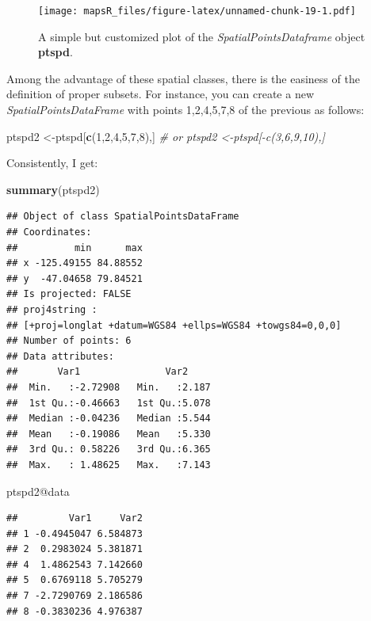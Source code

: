 \documentclass[]{report}
\newenvironment{Shaded}{\begin{snugshade}}{\end{snugshade}}
\newcommand{\KeywordTok}[1]{\textcolor[rgb]{0.13,0.29,0.53}{\textbf{{#1}}}}
\newcommand{\DecValTok}[1]{\textcolor[rgb]{0.00,0.00,0.81}{{#1}}}
\newcommand{\CommentTok}[1]{\textcolor[rgb]{0.56,0.35,0.01}{\textit{{#1}}}}
\newcommand{\NormalTok}[1]{{#1}}
\begin{document}
\begin{figure}[htbp]
\centering
\texttt{[image: mapsR\_files/figure-latex/unnamed-chunk-19-1.pdf]}
\caption{A simple but customized plot of the
\emph{SpatialPointsDataframe} object \textbf{ptspd}.}
\end{figure}

Among the advantage of these spatial classes, there is the easiness of
the definition of proper subsets. For instance, you can create a new
\emph{SpatialPointsDataFrame} with points 1,2,4,5,7,8 of the previous as
follows:

\begin{Shaded}
\begin{Highlighting}[]
\NormalTok{ptspd2 <-ptspd[}\KeywordTok{c}\NormalTok{(}\DecValTok{1}\NormalTok{,}\DecValTok{2}\NormalTok{,}\DecValTok{4}\NormalTok{,}\DecValTok{5}\NormalTok{,}\DecValTok{7}\NormalTok{,}\DecValTok{8}\NormalTok{),]}
\CommentTok{# or ptspd2 <-ptspd[-c(3,6,9,10),]}
\end{Highlighting}
\end{Shaded}

Consistently, I get:

\begin{Shaded}
\begin{Highlighting}[]
\KeywordTok{summary}\NormalTok{(ptspd2)}
\end{Highlighting}
\end{Shaded}

\begin{verbatim}
## Object of class SpatialPointsDataFrame
## Coordinates:
##          min      max
## x -125.49155 84.88552
## y  -47.04658 79.84521
## Is projected: FALSE 
## proj4string :
## [+proj=longlat +datum=WGS84 +ellps=WGS84 +towgs84=0,0,0]
## Number of points: 6
## Data attributes:
##       Var1               Var2      
##  Min.   :-2.72908   Min.   :2.187  
##  1st Qu.:-0.46663   1st Qu.:5.078  
##  Median :-0.04236   Median :5.544  
##  Mean   :-0.19086   Mean   :5.330  
##  3rd Qu.: 0.58226   3rd Qu.:6.365  
##  Max.   : 1.48625   Max.   :7.143
\end{verbatim}

\begin{Shaded}
\begin{Highlighting}[]
\NormalTok{ptspd2@data}
\end{Highlighting}
\end{Shaded}

\begin{verbatim}
##         Var1     Var2
## 1 -0.4945047 6.584873
## 2  0.2983024 5.381871
## 4  1.4862543 7.142660
## 5  0.6769118 5.705279
## 7 -2.7290769 2.186586
## 8 -0.3830236 4.976387
\end{verbatim}
\end{document}
